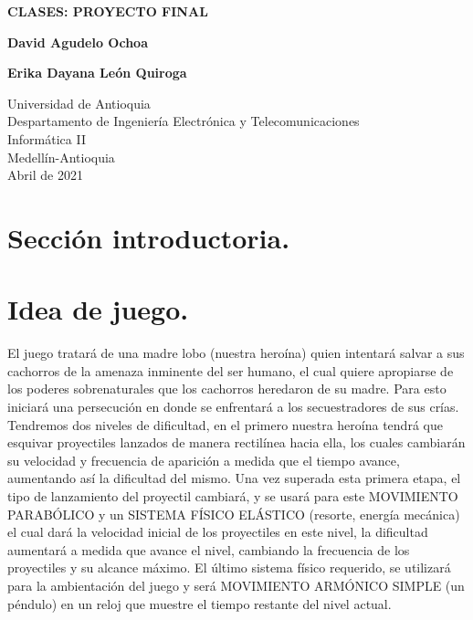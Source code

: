\documentclass{article}
\begin{document}
\begin{titlepage}
    \begin{center}
        \vspace*{0cm}
            
        \large
        \textbf{CLASES: PROYECTO FINAL}
            

        \vspace{8cm}
            
        \textbf{David Agudelo Ochoa}
        
        \vspace{0.5cm}
        
        \textbf{Erika Dayana León Quiroga}
            
        \vfill
            
        \vspace{0.8cm}
            
        \Large
        Universidad de Antioquia\\
        Despartamento de Ingeniería Electrónica y Telecomunicaciones\\
        Informática II\\
        Medellín-Antioquia\\
        Abril de 2021
            
    \end{center}
\end{titlepage}

\tableofcontents
\newpage
\section{Sección introductoria.}\label{intro}

\section{Idea de juego.}\label{integrado}
El juego tratará de una madre lobo (nuestra heroína) quien intentará salvar a sus cachorros de la amenaza inminente del ser humano, el cual quiere apropiarse de los poderes sobrenaturales que los cachorros heredaron de su madre. Para esto iniciará una persecución en donde se enfrentará a los secuestradores de sus crías. Tendremos dos niveles de dificultad, en el primero nuestra heroína tendrá que esquivar proyectiles lanzados de manera rectilínea hacia ella, los cuales cambiarán su velocidad y frecuencia de aparición a medida que el tiempo avance, aumentando así la dificultad del mismo. Una vez superada esta primera etapa, el tipo de lanzamiento del proyectil cambiará, y se usará para este MOVIMIENTO PARABÓLICO y un SISTEMA FÍSICO ELÁSTICO (resorte, energía mecánica) el cual dará la velocidad inicial de los proyectiles en este nivel, la dificultad aumentará a medida que avance el nivel, cambiando la frecuencia de los proyectiles y su alcance máximo.
El último sistema físico requerido, se utilizará para la ambientación del juego y será MOVIMIENTO ARMÓNICO SIMPLE (un péndulo) en un reloj que muestre el tiempo restante del nivel actual.
\end{document}
